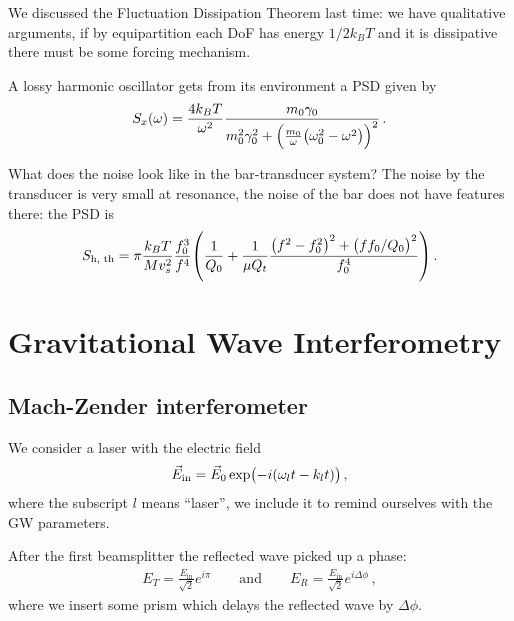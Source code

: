 \documentclass[main.tex]{subfiles}
\begin{document}

We discussed the Fluctuation Dissipation Theorem last time:
we have qualitative arguments, if by equipartition each DoF has energy \(1/2 k_B T\) and it is dissipative there must be some forcing mechanism.

A lossy harmonic oscillator gets from its environment a PSD given by 
%
\begin{align}
S_x (\omega ) = \frac{4 k_B T}{\omega^2}
\frac{m_0 \gamma_0 }{m_0^2 \gamma_0^2 + 
\qty( \frac{m_0}{\omega } \qty(\omega_0^2 - \omega^2))^2}
\,.
\end{align}

What does the noise look like in the bar-transducer system?
The noise by the transducer is very small at resonance, the noise of the bar does not have features there: the PSD is 
%
\begin{align}
S _{\text{h, th}} = \pi \frac{k_B T}{M v_s^2} 
\frac{f_0^3}{f^{4}} \qty( \frac{1}{Q_0} + \frac{1}{\mu Q_t} \frac{\qty(f^2-f_0^2)^2 + \qty(f f_0 / Q_0 )^2}{f_0^{4}})
\,.
\end{align}


\section{Gravitational Wave Interferometry}

\subsection{Mach-Zender interferometer}

We consider a laser with the electric field 
%
\begin{align}
\vec{E} _{\text{in}} = \vec{E}_{0} \exp(-i \qty(\omega_{l} t - k_l t))
\,,
\end{align}
%
where the subscript \(l\) means ``laser'', we include it to remind ourselves with the GW parameters.

After the first beamsplitter the reflected wave picked up a phase: 
%
\begin{align}
E_T = \frac{E _{\text{in}}}{\sqrt{2}} e^{i \pi }
\qquad \text{and} \qquad
E_R = \frac{E _{\text{in}}}{\sqrt{2}} e^{i \Delta \phi } 
\,,
\end{align}
%
where we insert some prism which delays the reflected wave by \(\Delta \phi \). 
\end{document}
